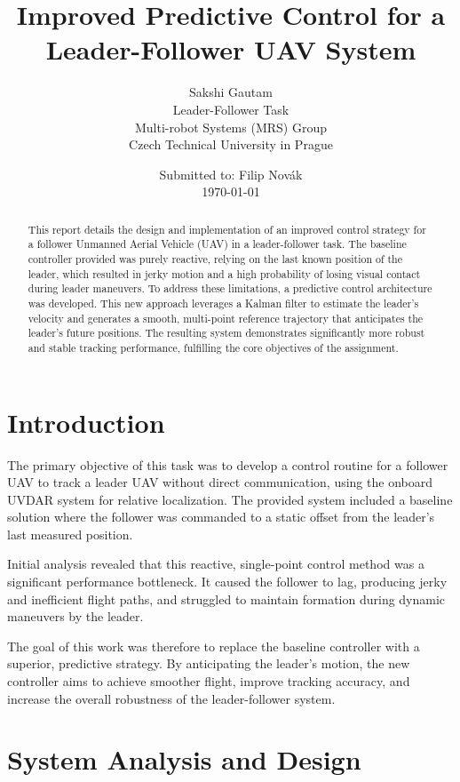 \documentclass[11pt, a4paper]{article}
\title{
    \vspace{2cm}
    \textbf{Improved Predictive Control for a Leader-Follower UAV System}
    \vspace{1cm}
}
\author{
    \large{Sakshi Gautam} \\
    \small{Leader-Follower Task} \\
    \small{Multi-robot Systems (MRS) Group} \\
    \small{Czech Technical University in Prague}
    \vspace{2cm}
}
\date{
    Submitted to: Filip Novák \\
    \large{\today}
    \vspace{3cm}
}
\begin{document}
\maketitle
\thispagestyle{empty}
\newpage

\begin{abstract}
\noindent This report details the design and implementation of an improved control strategy for a follower Unmanned Aerial Vehicle (UAV) in a leader-follower task. The baseline controller provided was purely reactive, relying on the last known position of the leader, which resulted in jerky motion and a high probability of losing visual contact during leader maneuvers. To address these limitations, a predictive control architecture was developed. This new approach leverages a Kalman filter to estimate the leader's velocity and generates a smooth, multi-point reference trajectory that anticipates the leader's future positions. The resulting system demonstrates significantly more robust and stable tracking performance, fulfilling the core objectives of the assignment.
\end{abstract}
\tableofcontents
\newpage

\section{Introduction}
The primary objective of this task was to develop a control routine for a follower UAV to track a leader UAV without direct communication, using the onboard UVDAR system for relative localization. The provided system included a baseline solution where the follower was commanded to a static offset from the leader's last measured position.

Initial analysis revealed that this reactive, single-point control method was a significant performance bottleneck. It caused the follower to lag, producing jerky and inefficient flight paths, and struggled to maintain formation during dynamic maneuvers by the leader.

The goal of this work was therefore to replace the baseline controller with a superior, predictive strategy. By anticipating the leader's motion, the new controller aims to achieve smoother flight, improve tracking accuracy, and increase the overall robustness of the leader-follower system.

\section{System Analysis and Design}
\end{document}

